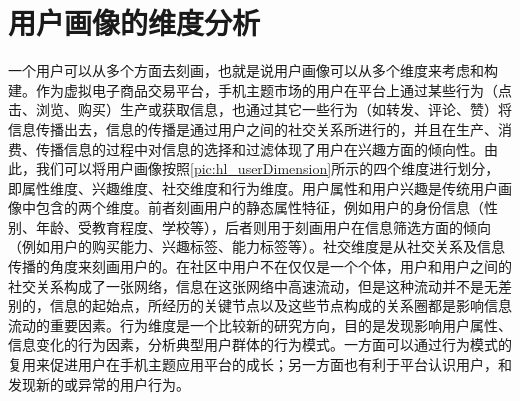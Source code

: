     \section{用户画像的维度分析}
    一个用户可以从多个方面去刻画，也就是说用户画像可以从多个维度来考虑和构建。作为虚拟电子商品交易平台，手机主题市场的用户在平台上通过某些行为（点击、浏览、购买）生产或获取信息，也通过其它一些行为（如转发、评论、赞）将信息传播出去，信息的传播是通过用户之间的社交关系所进行的，并且在生产、消费、传播信息的过程中对信息的选择和过滤体现了用户在兴趣方面的倾向性。由此，我们可以将用户画像按照\autoref{pic:hl_userDimension}所示的四个维度进行划分，即属性维度、兴趣维度、社交维度和行为维度。用户属性和用户兴趣是传统用户画像中包含的两个维度。前者刻画用户的静态属性特征，例如用户的身份信息（性别、年龄、受教育程度、学校等），后者则用于刻画用户在信息筛选方面的倾向（例如用户的购买能力、兴趣标签、能力标签等）。社交维度是从社交关系及信息传播的角度来刻画用户的。在社区中用户不在仅仅是一个个体，用户和用户之间的社交关系构成了一张网络，信息在这张网络中高速流动，但是这种流动并不是无差别的，信息的起始点，所经历的关键节点以及这些节点构成的关系圈都是影响信息流动的重要因素。行为维度是一个比较新的研究方向，目的是发现影响用户属性、信息变化的行为因素，分析典型用户群体的行为模式。一方面可以通过行为模式的复用来促进用户在手机主题应用平台的成长；另一方面也有利于平台认识用户，和发现新的或异常的用户行为。    
    \begin{figure}
    \centering
      \label{pic:hl_userDimension}
    \end{figure}

